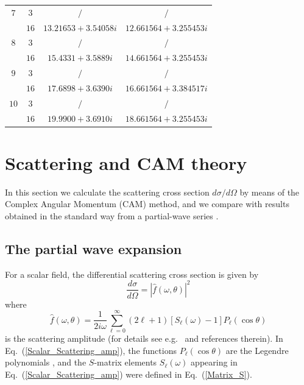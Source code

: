 \documentclass[aps,prd,longbibliography,reprint,twocolumn,amsmath,amssymb,amsfonts,showpacs,superscriptaddress]{revtex4-1}%
\begin{document}
\begin{table}[htp]
\begin{ruledtabular}
\begin{tabular}{cccc}
$7$  & $3$  & $/$ & $/$     \\
     & $16$ & $13.21653+3.54058 i$  & $12.661564+3.255453i$ \\

$8$  & $3$ & $/$   & $/$     \\
     & $16$ & $15.4331+3.5889 i$  & $14.661564+3.255453i $  \\

$9$  & $3$ & $/$   & $/$   \\
     & $16$ & $17.6898+3.6390 i$  & $16.661564+3.384517i $   \\

$10$  & $3$  & $/$  & $/$   \\
     & $16$  & $19.9900+3.6910 i$  & $18.661564+3.255453i $  \\
\end{tabular}
\end{ruledtabular}
\end{table}
\endgroup



\section{Scattering and CAM theory}
In this section we calculate the scattering cross section $d\sigma / d\Omega$ by means of the Complex Angular Momentum (CAM) method, and we compare with results obtained in the standard way from a partial-wave series \cite{Dolan:2017rtj}. 

\subsection{The partial wave expansion}

For a scalar field, the differential scattering cross section is given by
\begin{equation}\label{Scalar_Scattering_diff}
  \frac{d\sigma}{d\Omega} = |\hat{f}(\omega,\theta)|^2
\end{equation}
where
\begin{equation}\label{Scalar_Scattering_amp}
 \hat{f}(\omega,\theta) = \frac{1}{2 i \omega} \sum_{\ell = 0}^{\infty} (2\ell+1)[S_{\ell}(\omega)-1]P_{\ell}(\cos\theta)
\end{equation}
is the scattering amplitude (for details see e.g.~\cite{Dolan:2017rtj} and references therein).  In Eq.~(\ref{Scalar_Scattering_amp}), the functions $P_{\ell}(\cos\theta)$ are the Legendre polynomials \cite{AS65}, and the $S$-matrix elements $S_{\ell}(\omega)$ appearing in Eq.~(\ref{Scalar_Scattering_amp}) were defined in Eq.~(\ref{Matrix_S}).
\end{document}

